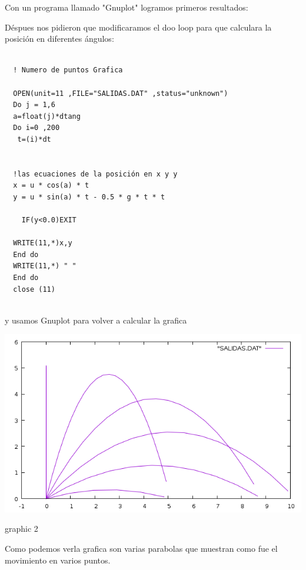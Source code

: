 \documentclass{article}
\begin{document}
Con un programa llamado "Gnuplot" logramos primeros resultados:



Déspues nos pidieron que modificaramos el doo loop para que calculara la posición en diferentes ángulos:

\begin{verbatim}
    
  ! Numero de puntos Grafica

  OPEN(unit=11 ,FILE="SALIDAS.DAT" ,status="unknown")
  Do j = 1,6
  a=float(j)*dtang
  Do i=0 ,200
   t=(i)*dt
  
  
  !las ecuaciones de la posición en x y y
  x = u * cos(a) * t
  y = u * sin(a) * t - 0.5 * g * t * t
 
	IF(y<0.0)EXIT

  WRITE(11,*)x,y
  End do
  WRITE(11,*) " "
  End do
  close (11)
 
\end{verbatim}

y usamos Gnuplot para volver a calcular la grafica


    \centering
    \includegraphics[scale=0.5]{grafica1.png}
    \caption{graphic 2}
    \label{fig:my_label}
    
    Como podemos verla grafica son varias parabolas que muestran como fue el movimiento en varios puntos.
\end{document}
